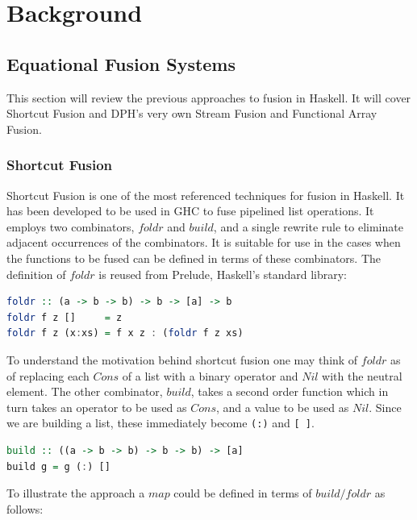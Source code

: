 \documentclass[preamble.tex]{subfiles}
\begin{document}
\pagebreak


\chapter{Background}


\section{Equational Fusion Systems}

This section will review the previous approaches to fusion in Haskell. It will cover Shortcut Fusion and DPH's very own Stream Fusion and Functional Array Fusion.


\subsection{Shortcut Fusion}

Shortcut Fusion \cite{GLP93} is one of the most referenced techniques for fusion in Haskell. It has been developed to be used in GHC to fuse pipelined list operations. It employs two combinators, $foldr$ and $build$, and a single rewrite rule to eliminate adjacent occurrences of the combinators. It is suitable for use in the cases when the functions to be fused can be defined in terms of these combinators. $ $The definition of $foldr$ is reused from Prelude, Haskell's standard library:

\begin{lstlisting}[basicstyle={\ttfamily},language=Haskell]
foldr :: (a -> b -> b) -> b -> [a] -> b
foldr f z []     = z
foldr f z (x:xs) = f x z : (foldr f z xs)
\end{lstlisting}


To understand the motivation behind shortcut fusion one may think of $foldr$ as of replacing each $Cons$ of a list with a binary operator and $Nil$ with the neutral element. The other combinator, $build$, takes a second order function which in turn takes an operator to be used as $Cons$, and a value to be used as $Nil$. Since we are building a list, these immediately become \texttt{(:)} and \texttt{{[} {]}}.

\begin{lstlisting}[basicstyle={\ttfamily},language=Haskell]
build :: ((a -> b -> b) -> b -> b) -> [a]
build g = g (:) []
\end{lstlisting}


To illustrate the approach a $map$ could be defined in terms of $build/foldr$ as follows:
\end{document}
